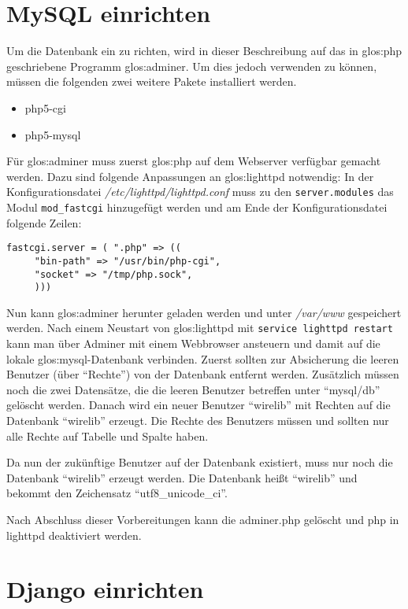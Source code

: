 \section{MySQL einrichten}
Um die Datenbank ein zu richten, wird in dieser Beschreibung auf das in
\Gls{glos:php} geschriebene Programm \Gls{glos:adminer}. Um dies jedoch
verwenden zu können, müssen die folgenden zwei weitere Pakete installiert
werden.

\begin{itemize}
  \item php5-cgi
  \item php5-mysql
\end{itemize}

Für \Gls{glos:adminer} muss zuerst \Gls{glos:php} auf dem Webserver verfügbar
gemacht werden. Dazu sind folgende Anpassungen an \Gls{glos:lighttpd}
notwendig:
In der Konfigurationsdatei \emph{/etc/lighttpd/lighttpd.conf} muss zu den
\lstinline{server.modules} das Modul \lstinline{mod_fastcgi} hinzugefügt
werden und am Ende der Konfigurationsdatei folgende Zeilen:

\begin{lstlisting}
fastcgi.server = ( ".php" => (( 
     "bin-path" => "/usr/bin/php-cgi",
     "socket" => "/tmp/php.sock",
     )))
\end{lstlisting}

Nun kann \Gls{glos:adminer} herunter geladen werden und unter \emph{/var/www}
gespeichert werden. Nach einem Neustart von \Gls{glos:lighttpd} mit
\lstinline{service lighttpd restart} kann man über Adminer mit einem Webbrowser
ansteuern und damit auf die lokale \Gls{glos:mysql}-Datenbank verbinden. Zuerst
sollten zur Absicherung die leeren Benutzer (über "`Rechte"') von der Datenbank
entfernt werden. Zusätzlich müssen noch die zwei Datensätze, die die leeren
Benutzer betreffen unter "`mysql/db"' gelöscht werden.  Danach wird ein neuer
Benutzer "`wirelib"' mit Rechten auf die Datenbank "`wirelib"' erzeugt. Die
Rechte des Benutzers müssen und sollten nur alle Rechte auf Tabelle und Spalte
haben.

Da nun der zukünftige Benutzer auf der Datenbank existiert, muss nur noch die
Datenbank "`wirelib"' erzeugt werden. Die Datenbank heißt "`wirelib"' und
bekommt den Zeichensatz "`utf8\_unicode\_ci"'.

Nach Abschluss dieser Vorbereitungen kann die adminer.php gelöscht und php in
lighttpd deaktiviert werden.

\section{Django einrichten}

